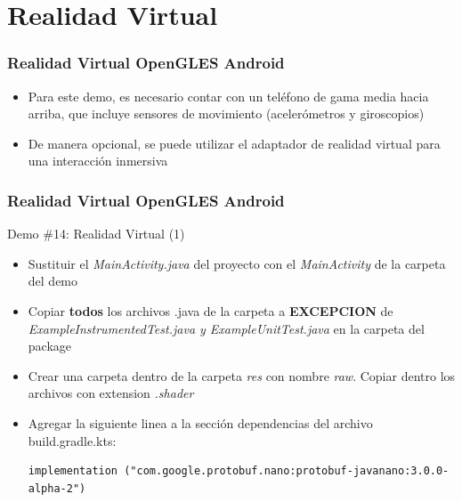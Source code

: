 \documentclass[aspectratio=169,compress]{beamer}
\begin{document}
\section[RV]{Realidad Virtual}
\begin{frame}[fragile]
\frametitle{Realidad Virtual OpenGLES Android}
\begin{itemize}
\item Para este demo, es necesario contar con un teléfono de gama media hacia arriba, que incluye sensores de movimiento (acelerómetros y giroscopios)
\item De manera opcional, se puede utilizar el adaptador de realidad virtual para una interacción inmersiva
\end{itemize}
\end{frame}


\begin{frame}[fragile]
\frametitle{Realidad Virtual OpenGLES Android}
\begin{block}{Demo \#14: Realidad Virtual (1)}
\begin{itemize}
\item Sustituir el \textit{MainActivity.java} del proyecto con el \textit{MainActivity} de la carpeta del demo
\item Copiar \textbf{todos} los archivos .java de la carpeta a \textbf{EXCEPCION} de \textit{ExampleInstrumentedTest.java y ExampleUnitTest.java} en la carpeta del package
\item Crear una carpeta dentro de la carpeta \textit{res} con nombre \textit{raw}. Copiar dentro los archivos con extension \textit{.shader}
\item Agregar la siguiente linea a la sección dependencias del archivo build.gradle.kts: 

\begin{verbatim}
implementation ("com.google.protobuf.nano:protobuf-javanano:3.0.0-alpha-2")
\end{verbatim}
\end{itemize}
\end{block}
\end{frame}
\end{document}

